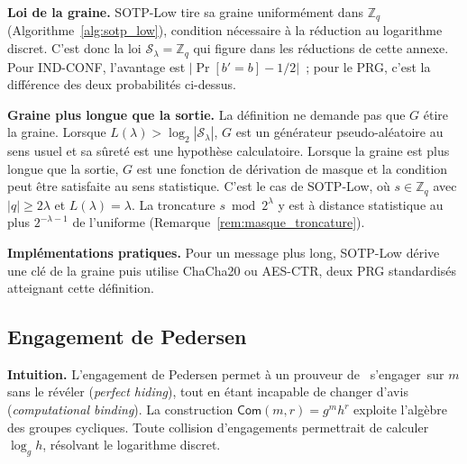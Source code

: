 \begin{sloppypar}
\noindent\textbf{Loi de la graine.} SOTP-Low tire sa graine uniform\'ement dans
$\mathbb{Z}_q$ (Algorithme~\ref{alg:sotp_low}), condition n\'ecessaire \`a la r\'eduction
au logarithme discret. C'est donc la loi $\mathcal{S}_\lambda = \mathbb{Z}_q$ qui
figure dans les r\'eductions de cette annexe. Pour IND-CONF, l'avantage est
$|\Pr[b' = b] - 1/2|$~; pour le PRG, c'est la diff\'erence des deux probabilit\'es
ci-dessus.

\noindent\textbf{Graine plus longue que la sortie.} La d\'efinition ne demande pas que $G$ \'etire
la graine. Lorsque $L(\lambda) > \log_2|\mathcal{S}_\lambda|$, $G$ est un g\'en\'erateur pseudo-al\'eatoire
au sens usuel et sa s\^uret\'e est une hypoth\`ese calculatoire. Lorsque la graine est plus longue que
la sortie, $G$ est une fonction de d\'erivation de masque et la condition peut \^etre satisfaite au
sens statistique. C'est le cas de SOTP-Low, o\`u $s \in \mathbb{Z}_q$ avec $|q| \geq 2\lambda$ et
$L(\lambda) = \lambda$. La troncature $s \bmod 2^\lambda$ y est \`a distance statistique au plus
$2^{-\lambda-1}$ de l'uniforme (Remarque~\ref{rem:masque_troncature}).

\noindent\textbf{Impl\'ementations pratiques.} Pour un message plus long, SOTP-Low d\'erive une cl\'e
de la graine puis utilise ChaCha20 ou AES-CTR, deux PRG standardis\'es atteignant cette d\'efinition.

\subsection{Engagement de Pedersen}

\noindent\textbf{Intuition.} L'engagement de Pedersen permet \`a un
prouveur de \guillemotleft~s'engager~\guillemotright sur $m$ sans le r\'ev\'eler (\emph{perfect hiding}),
tout en \'etant incapable de changer d'avis (\emph{computational binding}).
La construction $\mathsf{Com}(m, r) = g^m h^r$ exploite l'alg\`ebre des
groupes cycliques. Toute collision d'engagements permettrait de calculer
$\log_g h$, r\'esolvant le logarithme discret.


\end{sloppypar}
